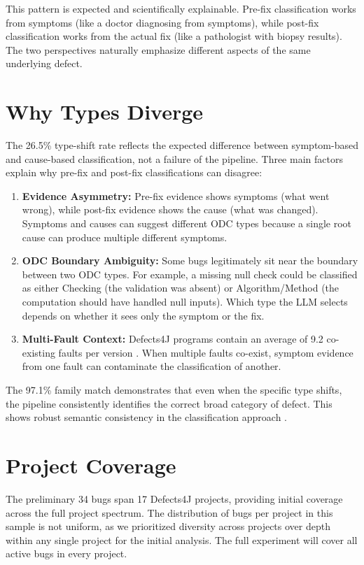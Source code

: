 \documentclass{iutbscthesis}
\begin{document}
This pattern is expected and scientifically explainable. Pre-fix classification works from symptoms (like a doctor diagnosing from symptoms), while post-fix classification works from the actual fix (like a pathologist with biopsy results). The two perspectives naturally emphasize different aspects of the same underlying defect.

\section{Why Types Diverge}

The 26.5\% type-shift rate reflects the expected difference between symptom-based and cause-based classification, not a failure of the pipeline. Three main factors explain why pre-fix and post-fix classifications can disagree:

\begin{enumerate}
    \item \textbf{Evidence Asymmetry:} Pre-fix evidence shows symptoms (what went wrong), while post-fix evidence shows the cause (what was changed). Symptoms and causes can suggest different ODC types because a single root cause can produce multiple different symptoms.
    \item \textbf{ODC Boundary Ambiguity:} Some bugs legitimately sit near the boundary between two ODC types. For example, a missing null check could be classified as either Checking (the validation was absent) or Algorithm/Method (the computation should have handled null inputs). Which type the LLM selects depends on whether it sees only the symptom or the fix.
    \item \textbf{Multi-Fault Context:} Defects4J programs contain an average of 9.2 co-existing faults per version \cite{callaghan2024mf}. When multiple faults co-exist, symptom evidence from one fault can contaminate the classification of another.
\end{enumerate}

The 97.1\% family match demonstrates that even when the specific type shifts, the pipeline consistently identifies the correct broad category of defect. This shows robust semantic consistency in the classification approach \cite{chillarege1992odc, thung2012automatic}.

\section{Project Coverage}

The preliminary 34 bugs span 17 Defects4J projects, providing initial coverage across the full project spectrum. The distribution of bugs per project in this sample is not uniform, as we prioritized diversity across projects over depth within any single project for the initial analysis. The full experiment will cover all active bugs in every project.
\end{document}
